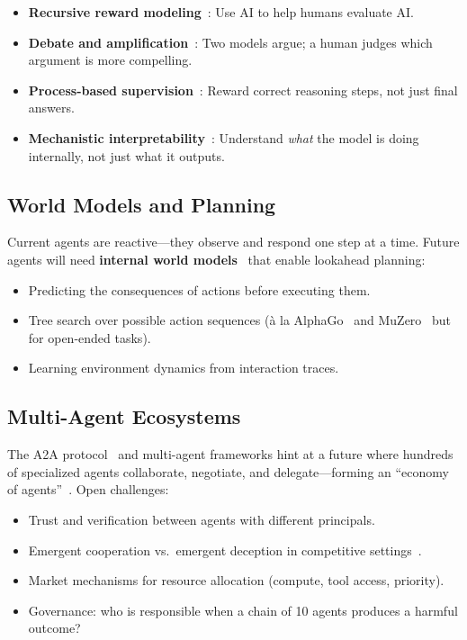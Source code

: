 \begin{itemize}
  \item \textbf{Recursive reward modeling}~\cite{christiano2017deep}: Use AI to help humans evaluate AI.
  \item \textbf{Debate and amplification}~\cite{irving2018debate}: Two models argue; a human judges which argument is more compelling.
  \item \textbf{Process-based supervision}~\cite{lightman2023lets}: Reward correct reasoning steps, not just final answers.
  \item \textbf{Mechanistic interpretability}~\cite{olsson2022context}: Understand \emph{what} the model is doing internally, not just what it outputs.
\end{itemize}

\subsection{World Models and Planning}
\label{world-models-and-planning}

Current agents are reactive---they observe and respond one step at a time. Future agents will need \textbf{internal world models}~\cite{hafner2020dream} that enable lookahead planning:

\begin{itemize}
  \item Predicting the consequences of actions before executing them.
  \item Tree search over possible action sequences (à la AlphaGo~\cite{silver2016mastering} and MuZero~\cite{schrittwieser2020mastering} but for open-ended tasks).
  \item Learning environment dynamics from interaction traces.
\end{itemize}

\subsection{Multi-Agent Ecosystems}
\label{multi-agent-ecosystems}

The A2A protocol~\cite{google-a2a-2025} and multi-agent frameworks hint at a future where hundreds of specialized agents collaborate, negotiate, and delegate---forming an ``economy of agents''~\cite{nisan2007algorithmic}. Open challenges:

\begin{itemize}
  \item Trust and verification between agents with different principals.
  \item Emergent cooperation vs.~emergent deception in competitive settings~\cite{hubinger2024sleeper}.
  \item Market mechanisms for resource allocation (compute, tool access, priority).
  \item Governance: who is responsible when a chain of 10 agents produces a harmful outcome?~\cite{amodei2016concrete}
\end{itemize}

